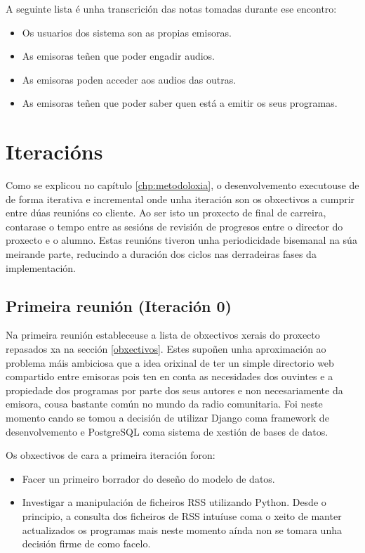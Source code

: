 A seguinte lista é unha transcrición das notas tomadas durante ese encontro:

\begin{itemize}
	\item Os usuarios dos sistema son as propias emisoras.
	\item As emisoras teñen que poder engadir audios.
	\item As emisoras poden acceder aos audios das outras.
	\item As emisoras teñen que poder saber quen está a emitir os seus programas.
\end{itemize}


\section{Iteracións}

Como se explicou no capítulo \ref{chp:metodoloxia}, o desenvolvemento executouse de  de forma iterativa e incremental onde unha iteración son os obxectivos a cumprir entre dúas reunións co cliente. Ao ser isto un proxecto de final de carreira, contarase o tempo entre as sesións de revisión de progresos entre o director do proxecto e o alumno. Estas reunións tiveron unha periodicidade bisemanal na súa meirande parte, reducindo a duración dos ciclos nas derradeiras fases da implementación.


\subsection{Primeira reunión (Iteración 0)}

Na primeira reunión estableceuse a lista de obxectivos xerais do proxecto repasados xa na sección \ref{obxectivos}. Estes supoñen unha aproximación ao problema máis ambiciosa que a idea orixinal de ter un simple directorio web compartido entre emisoras pois ten en conta as necesidades dos ouvintes e a propiedade dos programas por parte dos seus autores e non necesariamente da emisora, cousa bastante común no mundo da radio comunitaria. Foi neste momento cando se tomou a decisión de utilizar Django coma framework de desenvolvemento e PostgreSQL coma sistema de xestión de bases de datos.

Os obxectivos de cara a primeira iteración foron:

\begin{itemize}
	\item Facer un primeiro borrador do deseño do modelo de datos.
	\item Investigar a manipulación de ficheiros RSS utilizando Python. Desde o principio, a consulta dos ficheiros de RSS intuíuse coma o xeito de manter actualizados os programas mais neste momento aínda non se tomara unha decisión firme de como facelo.
\end{itemize}

